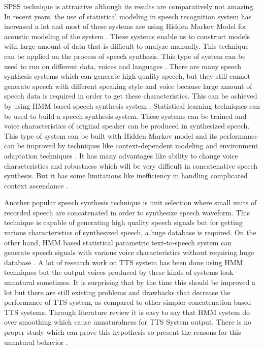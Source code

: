 SPSS technique is attractive although its results are comparatively not amazing. In recent years,
the use of statistical modeling in speech recognition system has increased a lot and most of these
systems are using Hidden Markov Model for acoustic modeling of the system \cite{donovan1999hidden}. These systems enable us to construct models with large amount of data that is difficult to analyze manually. This technique can be applied on the process of speech synthesis. This type of system can be used to run on different data, voices and languages \cite{donovan1999hidden}. There are many speech synthesis systems which can generate high quality speech, but they still cannot generate speech with different speaking style and voice because large amount of speech data is required in order to get these characteristics. This can be achieved by using HMM based speech synthesis system \cite{tokuda2002hmm}. Statistical learning techniques can be used to build a speech synthesis system. These systems can be trained and voice characteristics of original speaker can be produced in synthesized speech. This type of system can be built with Hidden Markov model and its performance can be improved by techniques like context-dependent modeling and environment adaptation techniques \cite{tokuda2000speech}. It has many advantages like ability to change voice characteristics and robustness which will be very difficult in concatenative speech synthesis. But it has some limitations like inefficiency in handling complicated context ascendance \cite{ze2013statistical}.

Another popular speech synthesis technique is unit selection where small units of recorded speech are concatenated in order to synthesize speech waveform. This technique is capable of generating high quality speech signals but for getting various characteristics of synthesized speech, a huge database is required. On the other hand, HMM based statistical parametric text-to-speech system can generate speech signals with various voice characteristics without requiring huge database \cite{zen2007hmm}. A lot of research work on TTS system has been done using HMM techniques but the output voices produced by these kinds of systems look unnatural sometimes. It is surprising that by the time this should be improved a lot but there are still existing problems and drawbacks that decrease the performance of TTS system, as compared to other simpler concatenation based TTS systems. Through literature review it is easy to say that HMM system do over smoothing which cause unnaturalness for TTS System output. There is no proper study which can prove this hypothesis so \cite{merritt2013investigating} present the reasons for this unnatural behavior \cite{merritt2013investigating}.

